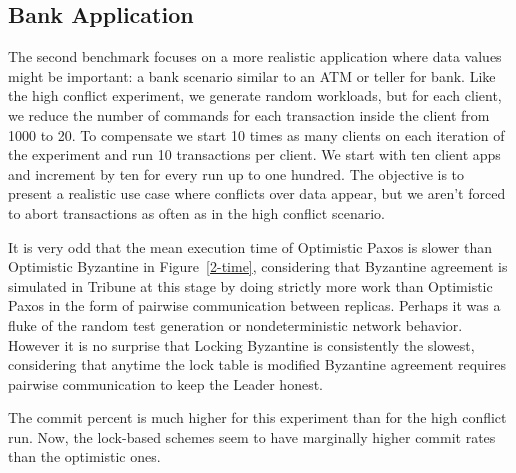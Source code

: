 \documentclass[10pt,twocolumn]{article}
\begin{document}
\subsection{Bank Application}

The second benchmark focuses on a more realistic application where data values might be important: a bank scenario similar to an ATM or teller for bank. Like the high conflict experiment, we generate random workloads, but for each client, we reduce the number of commands for each transaction inside the client from 1000 to 20. To compensate we start 10 times as many clients on each iteration of the experiment and run 10 transactions per client. We start with ten client apps and increment by ten for every run up to one hundred. The objective is to present a realistic use case where conflicts over data appear, but we aren't forced to abort transactions as often as in the high conflict scenario.

It is very odd that the mean execution time of Optimistic Paxos is slower than Optimistic Byzantine in Figure~\ref{2-time}, considering that Byzantine agreement is simulated in Tribune at this stage by doing strictly more work than Optimistic Paxos in the form of pairwise communication between replicas. Perhaps it was a fluke of the random test generation or nondeterministic network behavior. However it is no surprise that Locking Byzantine is consistently the slowest, considering that anytime the lock table is modified Byzantine agreement requires pairwise communication to keep the Leader honest.

The commit percent is much higher for this experiment than for the high conflict run. Now, the lock-based schemes seem to have marginally higher commit rates than the optimistic ones.
\end{document}
